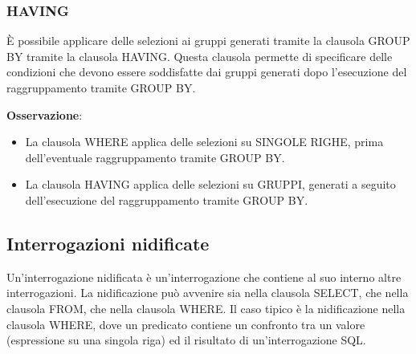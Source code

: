 \documentclass[a4paper,twoside]{article}
\begin{document}
\subsubsection{HAVING}
È possibile applicare delle selezioni ai gruppi generati tramite la clausola GROUP BY
tramite la clausola HAVING. Questa clausola permette di specificare delle condizioni che
devono essere soddisfatte dai gruppi generati dopo l’esecuzione
del raggruppamento tramite GROUP BY.

\vspace{1em}
\noindent
\textbf{Osservazione}:
\begin{itemize}
  \item La clausola WHERE applica delle selezioni su SINGOLE RIGHE, prima dell’eventuale
    raggruppamento tramite GROUP BY.

  \item La clausola HAVING applica delle selezioni su GRUPPI, generati a seguito dell’esecuzione del
    raggruppamento tramite GROUP BY.
\end{itemize}

\subsection{Interrogazioni nidificate}
Un'interrogazione nidificata è un'interrogazione che contiene al suo interno altre
interrogazioni. La nidificazione può avvenire sia nella clausola SELECT, che nella
clausola FROM, che nella clausola WHERE. Il caso tipico è la nidificazione nella clausola
WHERE, dove un predicato contiene un confronto tra un valore (espressione su una singola
riga) ed il risultato di un’interrogazione SQL.
\end{document}
